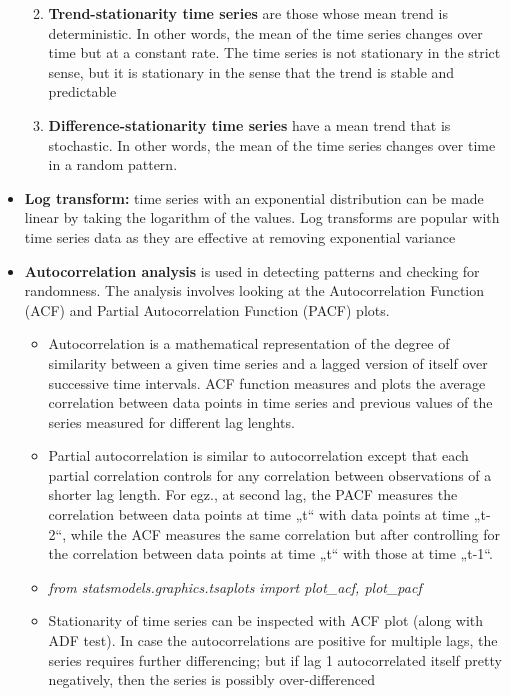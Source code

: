 \documentclass[
  letterpaper,
  DIV=11,
  numbers=noendperiod]{scrreprt}
\providecommand{\tightlist}{%
  \setlength{\itemsep}{0pt}\setlength{\parskip}{0pt}}\usepackage{longtable,booktabs,array}
\begin{document}
\begin{itemize}
  \begin{enumerate}
  \def\labelenumi{\alph{enumi}.}
  \tightlist
  \item
    \textbf{Trend-stationarity time series} are those whose mean trend
    is deterministic. In other words, the mean of the time series
    changes over time but at a constant rate. The time series is not
    stationary in the strict sense, but it is stationary in the sense
    that the trend is stable and predictable
  \item
    \textbf{Difference-stationarity time series} have a mean trend that
    is stochastic. In other words, the mean of the time series changes
    over time in a random pattern.
  \end{enumerate}
\item
  \textbf{Log transform:} time series with an exponential distribution
  can be made linear by taking the logarithm of the values. Log
  transforms are popular with time series data as they are effective at
  removing exponential variance
\item
  \textbf{Autocorrelation analysis} is used in detecting patterns and
  checking for randomness. The analysis involves looking at the
  Autocorrelation Function (ACF) and Partial Autocorrelation Function
  (PACF) plots.

  \begin{itemize}
  \tightlist
  \item
    Autocorrelation is a mathematical representation of the degree of
    similarity between a given time series and a lagged version of
    itself over successive time intervals. ACF function measures and
    plots the average correlation between data points in time series and
    previous values of the series measured for different lag lenghts.
  \item
    Partial autocorrelation is similar to autocorrelation except that
    each partial correlation controls for any correlation between
    observations of a shorter lag length. For egz., at second lag, the
    PACF measures the correlation between data points at time „t`` with
    data points at time „t-2``, while the ACF measures the same
    correlation but after controlling for the correlation between data
    points at time „t`` with those at time „t-1``.
  \item
    \emph{from statsmodels.graphics.tsaplots import plot\_acf,
    plot\_pacf}
  \item
    Stationarity of time series can be inspected with ACF plot (along
    with ADF test). In case the autocorrelations are positive for
    multiple lags, the series requires further differencing; but if lag
    1 autocorrelated itself pretty negatively, then the series is
    possibly over-differenced
  \end{itemize}
\end{itemize}
\end{document}
